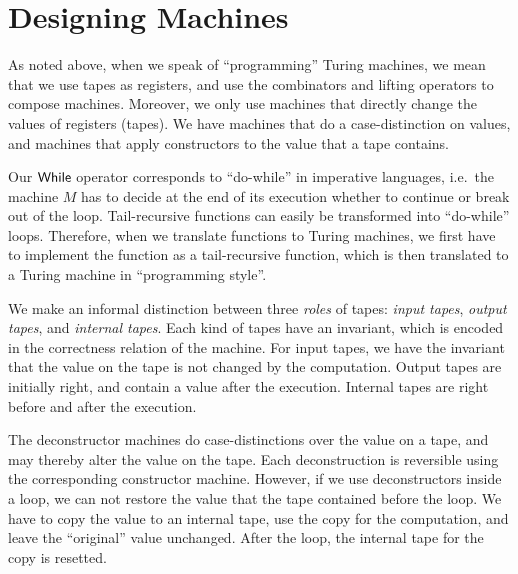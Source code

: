 \section{Designing Machines}
\label{sec:programming-design}
%

As noted above, when we speak of ``programming'' Turing machines, we mean that we use tapes as registers, and use the combinators and lifting
operators to compose machines.  Moreover, we only use machines that directly change the values of registers (tapes).  We have machines that do a
case-distinction on values, and machines that apply constructors to the value that a tape contains.

Our $\mathsf{While}$ operator corresponds to ``do-while'' in imperative languages, i.e.\ the machine $M$ has to decide at the end of its execution whether to
continue or break out of the loop.  Tail-recursive functions can easily be transformed into ``do-while'' loops.  Therefore, when we translate
functions to Turing machines, we first have to implement the function as a tail-recursive function, which is then translated to a Turing machine in
``programming style''.


We make an informal distinction between three \textit{roles} of tapes: \textit{input tapes}, \textit{output tapes}, and \textit{internal tapes}.  Each
kind of tapes have an invariant, which is encoded in the correctness relation of the machine.  For input tapes, we have the invariant that the value
on the tape is not changed by the computation.  Output tapes are initially right, and contain a value after the execution.  Internal tapes are right
before and after the execution.

The deconstructor machines do case-distinctions over the value on a tape, and may thereby alter the value on the tape.  Each deconstruction is
reversible using the corresponding constructor machine.  However, if we use deconstructors inside a loop, we can not restore the value that the tape
contained before the loop.  We have to copy the value to an internal tape, use the copy for the computation, and leave the ``original'' value
unchanged.  After the loop, the internal tape for the copy is resetted.


